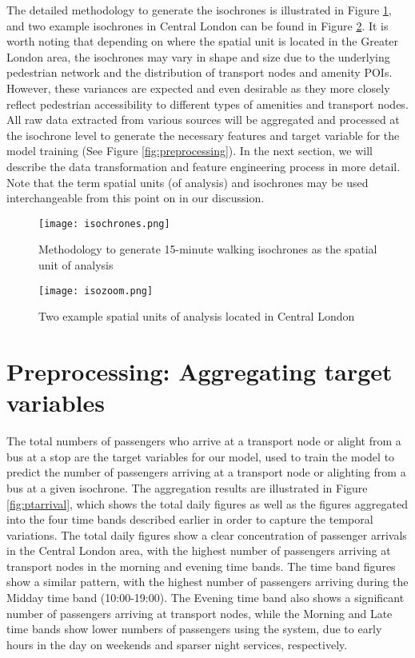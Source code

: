 The detailed methodology to generate the isochrones is illustrated in Figure \ref{fig:isochrones}, and two example isochrones in Central London can be found in Figure \ref{fig:isozoom}. It is worth noting that depending on where the spatial unit is located in the Greater London area, the isochrones may vary in shape and size due to the underlying pedestrian network and the distribution of transport nodes and amenity POIs. However, these variances are expected and even desirable as they more closely reflect pedestrian accessibility to different types of amenities and transport nodes. All raw data extracted from various sources will be aggregated and processed at the isochrone level to generate the necessary features and target variable for the model training (See Figure \ref{fig:preprocessing}). In the next section, we will describe the data transformation and feature engineering process in more detail. Note that the term spatial units (of analysis) and isochrones may be used interchangeable from this point on in our discussion.

\begin{figure}[ht]
    \centering
    \texttt{[image: isochrones.png]}
    \captionsetup{justification=centering}
    \caption{Methodology to generate 15-minute walking isochrones as the spatial unit of analysis}
    \label{fig:isochrones}
\end{figure}

\begin{figure}[!ht]
    \centering
    \texttt{[image: isozoom.png]}
    \caption{Two example spatial units of analysis located in Central London}
    \label{fig:isozoom}
\end{figure}




\pagebreak[4] %
\section{Preprocessing: Aggregating target variables}

The total numbers of passengers who arrive at a transport node or alight from a bus at a stop are the target variables for our model, used to train the model to predict the number of passengers arriving at a transport node or alighting from a bus at a given isochrone. 
The aggregation results are illustrated in Figure \ref{fig:ptarrival}, which shows the total daily figures as well as the figures aggregated into the four time bands described earlier in order to capture the temporal variations. The total daily figures show a clear concentration of passenger arrivals in the Central London area, with the highest number of passengers arriving at transport nodes in the morning and evening time bands. The time band figures show a similar pattern, with the highest number of passengers arriving during the Midday time band (10:00-19:00). The Evening time band also shows a significant number of passengers arriving at transport nodes, while the Morning and Late time bands show lower numbers of passengers using the system, due to early hours in the day on weekends and sparser night services, respectively.

